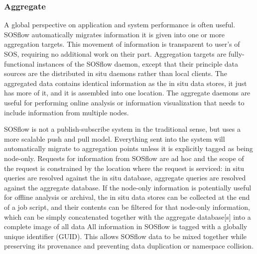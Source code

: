 \subsubsection{Aggregate} %
%
A global perspective on application and system performance is often useful.
%
SOSflow automatically migrates information it is given into one or more
aggregation targets.
%
This movement of information is transparent to user's of SOS, requiring
no additional work on their part.
%
Aggregation targets are fully-functional instances of the SOSflow daemon,
except that their principle data sources are the distributed in situ daemons
rather than local clients.
%
The aggregated data contains identical information as the in situ data stores,
it just has more of it, and it is assembled into one location.
%
The aggregate daemons are useful for performing online analysis or information
visualization that needs to include information from multiple nodes.
%
%
\par
%
SOSflow is not a publish-subscribe system in the traditional sense, but
uses a more scalable push and pull model.
%
Everything sent into the system will automatically migrate to
aggregation points unless it is explicitly tagged as being node-only.
%
Requests for information from SOSflow are ad hoc and the scope of the
request is constrained by the location where the request is serviced:
in situ queries are resolved against the in situ database, aggregate
queries are resolved against the aggregate database.
%
If the node-only information is potentially useful for offline analysis
or archival, the in situ data stores can be collected at the end of
a job script, and their contents can be filtered for that node-only
information, which can be simply concatenated together with the aggregate
database[s] into a complete image of all data
%
All information in SOSflow is tagged with a globally unique identifier
(GUID).
%
This allows SOSflow data to be mixed together while preserving its provenance
and preventing data duplication or namespace collision.
%

